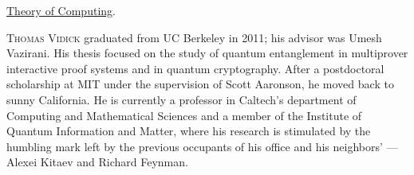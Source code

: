 \begin{tocaboutauthors}
\begin{tocabout}[jeffery]
  \href{http://theoryofcomputing.org}{\textsf{Theory of Computing}}.
\end{tocabout}
\begin{tocabout}[vidick]
\textsc{Thomas Vidick} graduated from UC Berkeley in 2011; his advisor was Umesh Vazirani. His thesis focused on the study of quantum entanglement in multiprover interactive proof systems and in quantum cryptography. After a postdoctoral scholarship at MIT under the supervision of Scott Aaronson, he moved back to sunny California. He is currently a professor in Caltech's department of Computing and Mathematical Sciences and a member of the Institute of Quantum Information and Matter, where his research is stimulated by the humbling mark left by the previous occupants of his office and his neighbors' — Alexei Kitaev and Richard Feynman.
\end{tocabout}
\end{tocaboutauthors}




